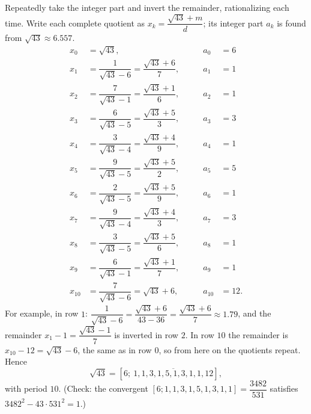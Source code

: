 Repeatedly take the integer part and invert the remainder, rationalizing each time. Write each complete quotient as $x_k=\dfrac{\sqrt{43}+m}{d}$; its integer part $a_k$ is found from $\sqrt{43}\approx6.557$.
\[
\begin{aligned}
x_{0}&=\sqrt{43}, &\qquad a_{0}&=6\\[6pt]
x_{1}&=\dfrac{1}{\sqrt{43}-6}=\dfrac{\sqrt{43}+6}{7}, &\qquad a_{1}&=1\\[6pt]
x_{2}&=\dfrac{7}{\sqrt{43}-1}=\dfrac{\sqrt{43}+1}{6}, &\qquad a_{2}&=1\\[6pt]
x_{3}&=\dfrac{6}{\sqrt{43}-5}=\dfrac{\sqrt{43}+5}{3}, &\qquad a_{3}&=3\\[6pt]
x_{4}&=\dfrac{3}{\sqrt{43}-4}=\dfrac{\sqrt{43}+4}{9}, &\qquad a_{4}&=1\\[6pt]
x_{5}&=\dfrac{9}{\sqrt{43}-5}=\dfrac{\sqrt{43}+5}{2}, &\qquad a_{5}&=5\\[6pt]
x_{6}&=\dfrac{2}{\sqrt{43}-5}=\dfrac{\sqrt{43}+5}{9}, &\qquad a_{6}&=1\\[6pt]
x_{7}&=\dfrac{9}{\sqrt{43}-4}=\dfrac{\sqrt{43}+4}{3}, &\qquad a_{7}&=3\\[6pt]
x_{8}&=\dfrac{3}{\sqrt{43}-5}=\dfrac{\sqrt{43}+5}{6}, &\qquad a_{8}&=1\\[6pt]
x_{9}&=\dfrac{6}{\sqrt{43}-1}=\dfrac{\sqrt{43}+1}{7}, &\qquad a_{9}&=1\\[6pt]
x_{10}&=\dfrac{7}{\sqrt{43}-6}=\sqrt{43}+6, &\qquad a_{10}&=12.
\end{aligned}
\]
For example, in row $1$: $\dfrac{1}{\sqrt{43}-6}=\dfrac{\sqrt{43}+6}{43-36}=\dfrac{\sqrt{43}+6}{7}\approx1.79$, and the remainder $x_1-1=\dfrac{\sqrt{43}-1}{7}$ is inverted in row $2$. In row $10$ the remainder is $x_{10}-12=\sqrt{43}-6$, the same as in row $0$, so from here on the quotients repeat. Hence
\[
\sqrt{43}=\boxed{[6;\ \overline{1,1,3,1,5,1,3,1,1,12}]},
\]
with period $10$. (Check: the convergent $[6;1,1,3,1,5,1,3,1,1]=\dfrac{3482}{531}$ satisfies $3482^2-43\cdot531^2=1$.)
